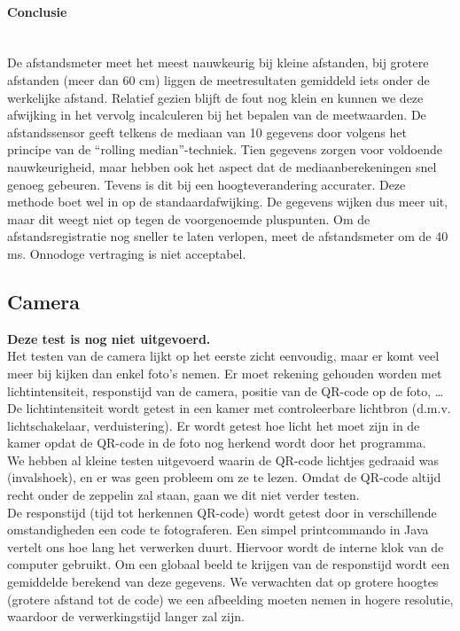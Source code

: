 \documentclass[tt]{penoverslag}
\begin{document}
\paragraph{Conclusie} ~\\ 
De afstandsmeter meet het meest nauwkeurig bij kleine afstanden, bij grotere afstanden (meer dan 60 cm) liggen de meetresultaten gemiddeld iets onder de werkelijke afstand. Relatief gezien blijft de fout nog klein en kunnen we deze afwijking in het vervolg incalculeren bij het bepalen van de meetwaarden. De afstandssensor geeft telkens de mediaan van 10 gegevens door volgens het principe van de “rolling median”-techniek. Tien gegevens zorgen voor voldoende nauwkeurigheid, maar hebben ook het aspect dat de mediaanberekeningen snel genoeg gebeuren. Tevens is dit bij een hoogteverandering accurater. Deze methode boet wel in op de standaardafwijking. De gegevens wijken dus meer uit, maar dit weegt niet op tegen de voorgenoemde pluspunten. Om de afstandsregistratie nog sneller te laten verlopen, meet de afstandsmeter om de 40 ms. Onnodoge vertraging is niet acceptabel.

\subsection{Camera}

\textbf{Deze test is nog niet uitgevoerd.} \\

Het testen van de camera lijkt op het eerste zicht eenvoudig, maar er komt veel meer bij kijken dan enkel foto's nemen. Er moet rekening gehouden worden met lichtintensiteit, responstijd van de camera, positie van de QR-code op de foto, \ldots \\

De lichtintensiteit wordt getest in een kamer met controleerbare lichtbron (d.m.v. lichtschakelaar, verduistering). Er wordt getest hoe licht het moet zijn in de kamer opdat de QR-code in de foto nog herkend wordt door het programma. \\

We hebben al kleine testen uitgevoerd waarin de QR-code lichtjes gedraaid was (invalshoek), en er was geen probleem om ze te lezen. Omdat de QR-code altijd recht onder de zeppelin zal staan, gaan we dit niet verder testen. \\

De responstijd (tijd tot herkennen QR-code) wordt getest door in verschillende omstandigheden een code te fotograferen. Een simpel printcommando in Java vertelt ons hoe lang het verwerken duurt. Hiervoor wordt de interne klok van de computer gebruikt. Om een globaal beeld te krijgen van de responstijd wordt een gemiddelde berekend van deze gegevens. We verwachten dat op grotere hoogtes (grotere afstand tot de code) we een afbeelding moeten nemen in hogere resolutie, waardoor de verwerkingstijd langer zal zijn. \\
\end{document}
